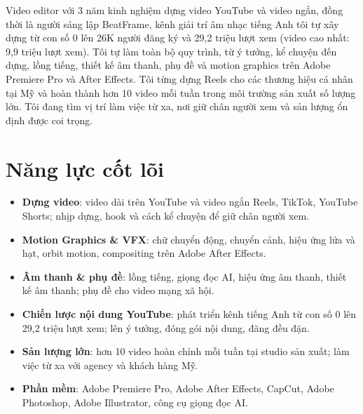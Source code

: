 \documentclass[11pt,a4paper,sans]{moderncv}
\begin{document}
\makecvtitle


\vspace{6pt}
\small{Video editor với 3 năm kinh nghiệm dựng video YouTube và video ngắn, đồng thời là người sáng lập BeatFrame, kênh giải trí âm nhạc tiếng Anh tôi tự xây dựng từ con số 0 lên 26K người đăng ký và 29,2 triệu lượt xem (video cao nhất: 9,9 triệu lượt xem). Tôi tự làm toàn bộ quy trình, từ ý tưởng, kể chuyện đến dựng, lồng tiếng, thiết kế âm thanh, phụ đề và motion graphics trên Adobe Premiere Pro và After Effects. Tôi từng dựng Reels cho các thương hiệu cá nhân tại Mỹ và hoàn thành hơn 10 video mỗi tuần trong môi trường sản xuất số lượng lớn. Tôi đang tìm vị trí làm việc từ xa, nơi giữ chân người xem và sản lượng ổn định được coi trọng.}


\section{Năng lực cốt lõi}
\vspace{1pt}
\begin{itemize}
\item \textbf{Dựng video}: video dài trên YouTube và video ngắn Reels, TikTok, YouTube Shorts; nhịp dựng, hook và cách kể chuyện để giữ chân người xem.
\item \textbf{Motion Graphics \& VFX}: chữ chuyển động, chuyển cảnh, hiệu ứng lửa và hạt, orbit motion, compositing trên Adobe After Effects.
\item \textbf{Âm thanh \& phụ đề}: lồng tiếng, giọng đọc AI, hiệu ứng âm thanh, thiết kế âm thanh; phụ đề cho video mạng xã hội.
\item \textbf{Chiến lược nội dung YouTube}: phát triển kênh tiếng Anh từ con số 0 lên 29,2 triệu lượt xem; lên ý tưởng, đóng gói nội dung, đăng đều đặn.
\item \textbf{Sản lượng lớn}: hơn 10 video hoàn chỉnh mỗi tuần tại studio sản xuất; làm việc từ xa với agency và khách hàng Mỹ.
\item \textbf{Phần mềm}: Adobe Premiere Pro, Adobe After Effects, CapCut, Adobe Photoshop, Adobe Illustrator, công cụ giọng đọc AI.
\end{itemize}
\end{document}
